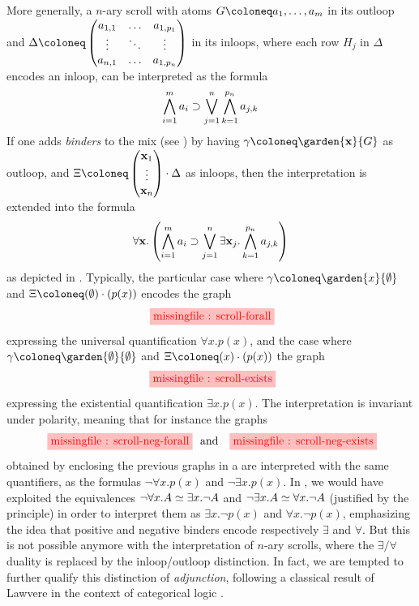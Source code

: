 More generally, a $n$-ary scroll with atoms $G \deq a_1, \ldots, a_m$ in its
outloop and $\Delta \deq \begin{pmatrix} a_{1,1} & \ldots & a_{1,p_1} \\
  \vdots & \ddots & \vdots \\
  a_{n,1} & \ldots & a_{1,p_n}
\end{pmatrix}$
in its inloops, where each row $H_j$ in $\Delta$ encodes an inloop, can be
interpreted as the formula
$$\bigwedge_{i = 1}^{m}{a_i} \supset \bigvee_{j = 1}^{n}\bigwedge_{k = 1}^{p_n}{a_{j,k}}$$
If one adds \emph{binders} to the mix (see ) by having $\gamma \deq
\garden{\bx}{G}$ as outloop, and
$\Xi \deq \begin{pmatrix}
  \bx_1 \\
  \vdots \\
  \bx_n
\end{pmatrix} \cdot \Delta$ as inloops, then the interpretation is extended into
the formula
$$\forall \mathbf{x}. \left(\bigwedge_{i = 1}^{m}{a_i} \supset \bigvee_{j = 1}^{n}\exists \mathbf{x}_j. \bigwedge_{k = 1}^{p_n}{a_{j,k}}\right)$$
as depicted in . Typically, the particular case where $\gamma
\deq \garden{x}{\emptyset}$ and $\Xi \deq (\emptyset) \cdot (p(x))$ encodes the graph
$$\stkfig{1}{scroll-forall}$$
expressing the universal quantification $\forall x. p(x)$, and the case where
$\gamma \deq \garden{\emptyset}{\emptyset}$ and $\Xi \deq (x) \cdot (p(x))$ the graph
$$\stkfig{1}{scroll-exists}$$
expressing the existential quantification $\exists x. p(x)$. The interpretation
is invariant under polarity, meaning that for instance the graphs
$$\stkfig{1}{scroll-neg-forall} \text{   and   } \stkfig{1}{scroll-neg-exists}$$
obtained by enclosing the previous graphs in a  are interpreted with the same
quantifiers, as the formulas $\neg \forall x. p(x)$ and $\neg \exists x. p(x)$.
In , we would have exploited the  equivalences $\neg \forall
x. A \simeq \exists x. \neg A$ and $\neg \exists x. A \simeq \forall x.
\neg A$ (justified by the  principle) in order to interpret them as
$\exists x. \neg p(x)$ and $\forall x. \neg p(x)$, emphasizing the idea that
positive and negative binders encode respectively $\exists$ and $\forall$. But
this is not possible anymore with the  interpretation of $n$-ary
scrolls, where the $\exists/\forall$ duality is replaced by the inloop/outloop
distinction. In fact, we are tempted to further qualify this distinction of
\emph{adjunction}, following a classical result of Lawvere in the context of
categorical logic .

